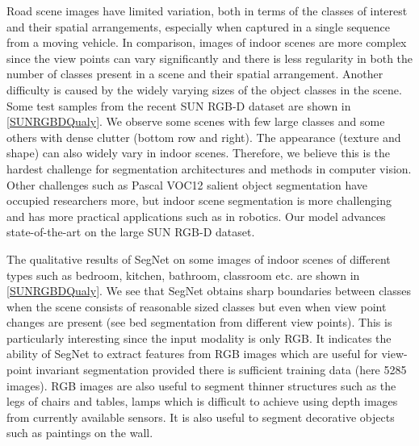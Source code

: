 Road scene images have limited variation, both in terms of the classes of interest and their spatial arrangements, especially when captured in a single sequence from a moving vehicle. In comparison, images of indoor scenes are more complex since the view points can vary significantly and there is less regularity in both the number of classes present in a scene and their spatial arrangement. Another difficulty is caused by the widely varying sizes of the object classes in the scene. Some test samples from the recent SUN RGB-D dataset \citep{song2015sun} are shown in \cref{SUNRGBDQualy}. We observe some scenes with few large classes and some others with dense clutter (bottom row and right). The appearance (texture and shape) can also widely vary in indoor scenes. Therefore, we believe this is the hardest challenge for segmentation architectures and methods in computer vision. Other challenges such as Pascal VOC12 \citep{pascal} salient object segmentation have occupied researchers more, but indoor scene segmentation is more challenging and has more practical applications such as in robotics. Our model advances state-of-the-art on the large SUN RGB-D dataset.

The qualitative results of SegNet on some images of indoor scenes of different types such as bedroom, kitchen, bathroom, classroom etc. are shown in \cref{SUNRGBDQualy}. We see that SegNet obtains sharp boundaries between classes when the scene consists of reasonable sized classes but even when view point changes are present (see bed segmentation from different view points). This is particularly interesting since the input modality is only RGB. It indicates the ability of SegNet to extract features from RGB images which are useful for view-point invariant segmentation provided there is sufficient training data (here 5285 images). RGB images are also useful to segment thinner structures such as the legs of chairs and tables, lamps which is difficult to achieve using depth images from currently available sensors. It is also useful to segment decorative objects such as paintings on the wall. 


